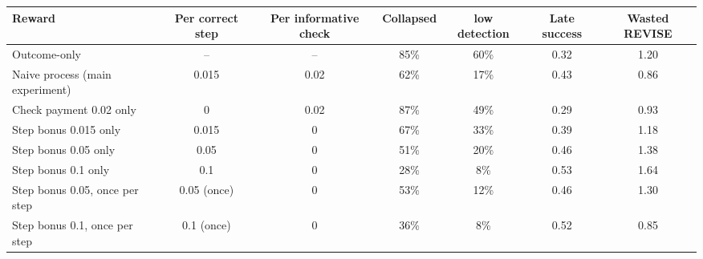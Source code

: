 \begin{tabular}{lcccccc}
\toprule
Reward & Per correct step & Per informative check & Collapsed & low detection & Late success & Wasted REVISE \\
\midrule
Outcome-only & -- & -- & 85\% & 60\% & 0.32 & 1.20 \\
Naive process (main experiment) & 0.015 & 0.02 & 62\% & 17\% & 0.43 & 0.86 \\
Check payment 0.02 only & 0 & 0.02 & 87\% & 49\% & 0.29 & 0.93 \\
Step bonus 0.015 only & 0.015 & 0 & 67\% & 33\% & 0.39 & 1.18 \\
Step bonus 0.05 only & 0.05 & 0 & 51\% & 20\% & 0.46 & 1.38 \\
Step bonus 0.1 only & 0.1 & 0 & 28\% & 8\% & 0.53 & 1.64 \\
Step bonus 0.05, once per step & 0.05 (once) & 0 & 53\% & 12\% & 0.46 & 1.30 \\
Step bonus 0.1, once per step & 0.1 (once) & 0 & 36\% & 8\% & 0.52 & 0.85 \\
\bottomrule
\end{tabular}
